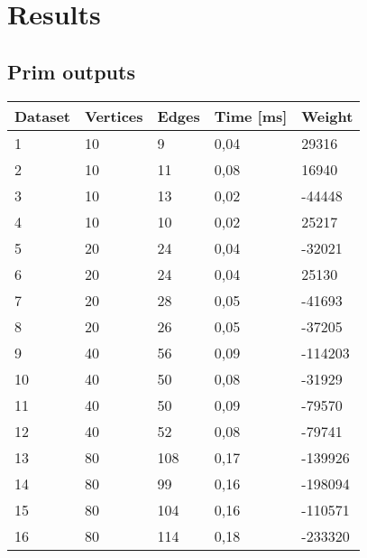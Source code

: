 \section{Results}

\subsection{Prim outputs}
\begin{longtable}{lllll}
    \textbf{Dataset} & \textbf{Vertices} & \textbf{Edges} & \textbf{Time [ms]} & \textbf{Weight} \\
    \endhead
    1                & 10             & 9              & 0,04       & 29316           \\
    2                & 10             & 11             & 0,08       & 16940           \\
    3                & 10             & 13             & 0,02       & -44448          \\
    4                & 10             & 10             & 0,02       & 25217           \\
    5                & 20             & 24             & 0,04     & -32021          \\
    6                & 20             & 24             & 0,04     & 25130           \\
    7                & 20             & 28             & 0,05     & -41693          \\
    8                & 20             & 26             & 0,05      & -37205          \\
    9                & 40             & 56             & 0,09      & -114203         \\
    10               & 40             & 50             & 0,08      & -31929          \\
    11               & 40             & 50             & 0,09      & -79570          \\
    12               & 40             & 52             & 0,08      & -79741          \\
    13               & 80             & 108            & 0,17      & -139926         \\
    14               & 80             & 99             & 0,16      & -198094         \\
    15               & 80             & 104            & 0,16      & -110571         \\
    16               & 80             & 114            & 0,18      & -233320         \\

\end{longtable}
